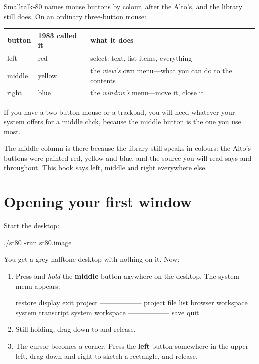 Smalltalk-80 names mouse buttons by colour, after the Alto's, and the library
still does. On an ordinary three-button mouse:

\begin{center}
\small
\begin{tabular}{@{}llp{}@{}}
\toprule
button & 1983 called it & what it does\\
\midrule
left   & red    & select: text, list items, everything\\
middle & yellow & the \emph{view's} own menu---what you can do to the contents\\
right  & blue   & the \emph{window's} menu---move it, close it\\
\bottomrule
\end{tabular}
\end{center}

If you have a two-button mouse or a trackpad, you will need whatever your
system offers for a middle click, because the middle button is the one you
use most.

The middle column is there because the library still speaks in colours: the
Alto's buttons were painted red, yellow and blue, and the source you will
read says  and  throughout. This
book says left, middle and right everywhere else.

\section{Opening your first window}

Start the desktop:

\begin{sh}
./st80 -run st80.image
\end{sh}

You get a grey halftone desktop with nothing on it. Now:

\begin{enumerate}
\item Press and \emph{hold} the \textbf{middle} button anywhere on
  the desktop. The system menu appears:
\begin{plain}
restore display
exit project
------------------
project
file list
browser
workspace
system transcript
system workspace
------------------
save
quit
\end{plain}
\item Still holding, drag down to  and release.
\item The cursor becomes a corner. Press the \textbf{left} button
  somewhere in the upper left, drag down and right to sketch a rectangle, and
  release.
\end{enumerate}

